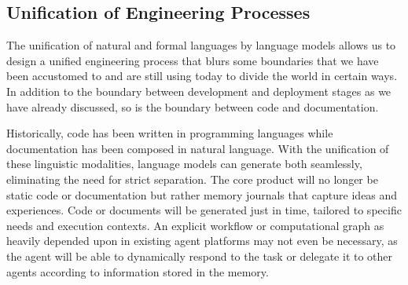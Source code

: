 \subsection{Unification of Engineering Processes}
\label{sec:unification}

The unification of natural and formal languages by language models allows us to design a unified engineering process that blurs some boundaries that we have been accustomed to and are still using today to divide the world in certain ways. In addition to the boundary between development and deployment stages as we have already discussed, so is the boundary between code and documentation.

Historically, code has been written in programming languages while documentation has been composed in natural language. With the unification of these linguistic modalities, language models can generate both seamlessly, eliminating the need for strict separation. The core product will no longer be static code or documentation but rather memory journals that capture ideas and experiences. Code or documents will be generated just in time, tailored to specific needs and execution contexts. An explicit workflow or computational graph as heavily depended upon in existing agent platforms may not even be necessary, as the agent will be able to dynamically respond to the task or delegate it to other agents according to information stored in the memory.

